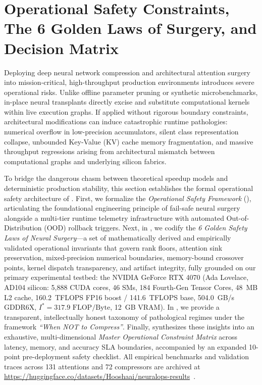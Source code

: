 \section{Operational Safety Constraints, The 6 Golden Laws of Surgery, and Decision Matrix}
\label{sec:safety_guidelines_matrix}

Deploying deep neural network compression and architectural attention surgery into mission-critical, high-throughput production environments introduces severe operational risks. Unlike offline parameter pruning or synthetic microbenchmarks, in-place neural transplants directly excise and substitute computational kernels within live execution graphs. If applied without rigorous boundary constraints, architectural modifications can induce catastrophic runtime pathologies: numerical overflow in low-precision accumulators, silent class representation collapse, unbounded Key-Value (KV) cache memory fragmentation, and massive throughput regressions arising from architectural mismatch between computational graphs and underlying silicon fabrics.

To bridge the dangerous chasm between theoretical speedup models and deterministic production stability, this section establishes the formal operational safety architecture of \neuralops{}. First, we formalize the \emph{Operational Safety Framework} (), articulating the foundational engineering principle of fail-safe neural surgery alongside a multi-tier runtime telemetry infrastructure with automated Out-of-Distribution (OOD) rollback triggers. Next, in , we codify the \emph{6 Golden Safety Laws of Neural Surgery}---a set of mathematically derived and empirically validated operational invariants that govern rank floors, attention sink preservation, mixed-precision numerical boundaries, memory-bound crossover points, kernel dispatch transparency, and artifact integrity, fully grounded on our primary experimental testbed: the NVIDIA GeForce RTX 4070 (Ada Lovelace, AD104 silicon: 5,888 CUDA cores, 46 SMs, 184 Fourth-Gen Tensor Cores, 48~MB L2 cache, 160.2~TFLOPS FP16 boost / 141.6~TFLOPS base, 504.0~GB/s GDDR6X, $I^* = 317.9\text{ FLOP/Byte}$, 12~GB VRAM). In , we provide a transparent, intellectually honest taxonomy of pathological regimes under the framework \emph{``When NOT to Compress''}. Finally,  synthesizes these insights into an exhaustive, multi-dimensional \emph{Master Operational Constraint Matrix} across latency, memory, and accuracy SLA boundaries, accompanied by an expanded 10-point pre-deployment safety checklist. All empirical benchmarks and validation traces across 131 attentions and 72 compressors are archived at \url{https://huggingface.co/datasets/Hooshaai/neuralops-results}~\cite{neuralops_results_hf}.


